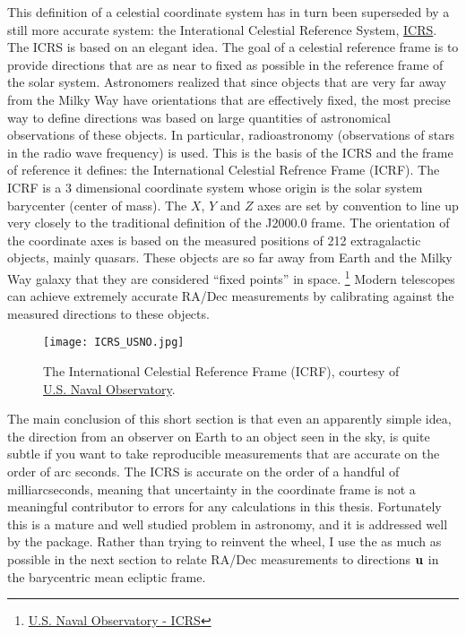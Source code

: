 This definition of a celestial coordinate system has in turn been superseded by a still more accurate system:
the Interational Celestial Reference System, \href{https://en.wikipedia.org/wiki/International_Celestial_Reference_System}{ICRS}.
The ICRS is based on an elegant idea.
The goal of a celestial reference frame is to provide directions that are as near to fixed as possible in the reference frame of the solar system.
Astronomers realized that since objects that are very far away from the Milky Way have orientations that are effectively fixed,
the most precise way to define directions was based on large quantities of astronomical observations of these objects.
In particular, radioastronomy (observations of stars in the radio wave frequency) is used.
This is the basis of the ICRS and the frame of reference it defines: the International Celestial Refrence Frame (ICRF).
The ICRF is a 3 dimensional coordinate system whose origin is the solar system barycenter (center of mass).
The $X$, $Y$ and $Z$ axes are set by convention to line up very closely to the traditional definition of the J2000.0 frame.
The orientation of the coordinate axes is based on the measured positions of 212 extragalactic objects, mainly quasars.
These objects are so far away from Earth and the Milky Way galaxy that they are considered ``fixed points'' in space.
\footnote{\href{http://kejian1.cmatc.cn/vod/comet/oceans/naval_observatory/navmenu.php_tab_1_page_3.2.1_type_text.htm}{U.S. Naval Observatory - ICRS}}
Modern telescopes can achieve extremely accurate RA/Dec measurements by calibrating against the measured directions to these objects.
\begin{figure}[hbt!]
\begin{center}
\texttt{[image: ICRS\_USNO.jpg]}
\caption{The International Celestial Reference Frame (ICRF), courtesy of 
\href{http://kejian1.cmatc.cn/vod/comet/oceans/naval_observatory/navmenu.php_tab_1_page_3.2.1_type_text.htm}{U.S. Naval Observatory}.}
\end{center}
\end{figure}

The main conclusion of this short section is that even an apparently simple idea, the direction from an observer on Earth to an object seen in the sky,
is quite subtle if you want to take reproducible measurements that are accurate on the order of arc seconds.
The ICRS is accurate on the order of a handful of milliarcseconds, 
meaning that uncertainty in the coordinate frame is not a meaningful contributor to errors for any calculations in this thesis.
Fortunately this is a mature and well studied problem in astronomy, and it is addressed well by the  package.
Rather than trying to reinvent the wheel, I use the  as much as possible in the next section
to relate RA/Dec measurements to directions $\mathbf{u}$ in the barycentric mean ecliptic frame.

